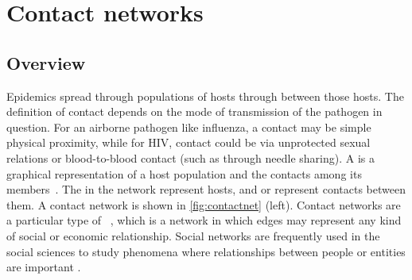 
\section{Contact networks}
\label{sec:contactnet}

\subsection{Overview}
\label{subsec:netoverview}

Epidemics spread through populations of hosts through  between
those hosts. The definition of contact depends on the mode of transmission of
the pathogen in question. For an airborne pathogen like influenza, a contact
may be simple physical proximity, while for \gls{HIV}, contact could be via
unprotected sexual relations or blood-to-blood contact (such as through needle
sharing). A  is a graphical representation of a host
population and the contacts among its members~\autocite{klovdahl1985social,
morris1993epidemiology, keeling2005networks}. The  in the network
represent hosts, and  or  represent contacts between
them. A contact network is shown in \cref{fig:contactnet} (left). Contact
networks are a particular type of ~\autocite{moreno1934shall, barnes1954class}, which is a network in
which edges may represent any kind of social or economic relationship. Social
networks are frequently used in the social sciences to study phenomena where
relationships between people or entities are important \autocite[for a review
see][]{wasserman1994social}.

